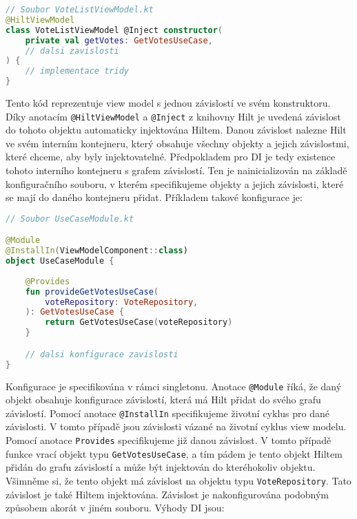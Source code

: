 \begin{lstlisting}[caption={Příklad použití DI pomocí knihovny Hilt}, label={lst:hilt-di}, tabsize=2, language=Kotlin]
// Soubor VoteListViewModel.kt
@HiltViewModel
class VoteListViewModel @Inject constructor(
	private val getVotes: GetVotesUseCase,
	// dalsi zavislosti
) {	
	// implementace tridy
}
\end{lstlisting}

\noindent Tento kód reprezentuje view model s jednou závislostí ve svém konstruktoru. Díky anotacím  \lstinline|@HiltViewModel| a \lstinline|@Inject| z knihovny Hilt je uvedená závislost do tohoto objektu automaticky injektována Hiltem. Danou závislost nalezne Hilt ve svém interním kontejneru, který obsahuje všechny objekty a jejich závislostmi, které chceme, aby byly injektovatelné. Předpokladem pro DI je tedy existence tohoto interního kontejneru s grafem závislostí. Ten je nainicializován na základě konfiguračního souboru, v kterém specifikujeme objekty a jejich závislosti, které se mají do daného kontejneru přidat. Příkladem takové konfigurace je:

\begin{lstlisting}[caption={Ukázka konfigurace DI pro Hilt}, label={lst:hilt-config}, tabsize=2, language=Kotlin]
// Soubor UseCaseModule.kt

@Module
@InstallIn(ViewModelComponent::class)
object UseCaseModule {	
	
	@Provides
	fun provideGetVotesUseCase(
		voteRepository: VoteRepository,
	): GetVotesUseCase {
		return GetVotesUseCase(voteRepository)
	}

	// dalsi konfigurace zavislosti
}
\end{lstlisting}

\noindent Konfigurace je specifikována v rámci singletonu. Anotace \lstinline|@Module| říká, že daný objekt obsahuje konfigurace závislostí, která má Hilt přidat do svého grafu závislostí. Pomocí anotace \lstinline|@InstallIn| specifikujeme životní cyklus pro dané závislosti. V tomto případě jsou závislosti vázané na životní cyklus view modelu. Pomocí anotace \lstinline|Provides| specifikujeme již danou závislost. V tomto případě funkce vrací objekt typu \lstinline|GetVotesUseCase|, a tím pádem je tento objekt Hiltem přidán do grafu závislostí a může být injektován do kteréhokoliv objektu. Všimněme si, že tento objekt má závislost na objektu typu \lstinline|VoteRepository|. Tato závislost je také Hiltem injektována. Závislost je nakonfigurována podobným způsobem akorát v jiném souboru. Výhody DI jsou:

